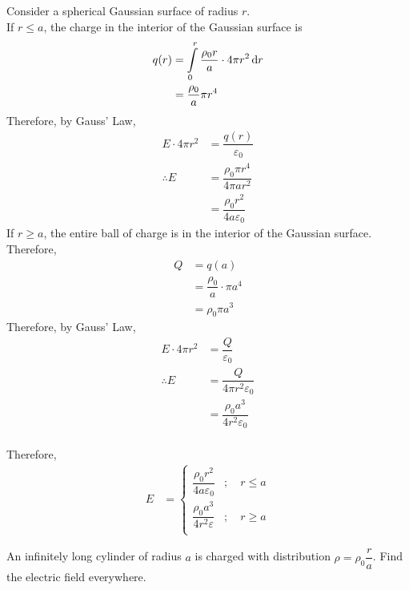 \documentclass[fleqn, a4paper, 12pt, twoside]{article}
\theoremstyle{definition}
\theoremstyle{theorem}
\begin{document}
\begin{solution}
	Consider a spherical Gaussian surface of radius $r$.\\
	If $r \leq a$, the charge in the interior of the Gaussian surface is
	\begin{align*}
		q(r) &= \int\limits_{0}^{r} \dfrac{\rho_0 r}{a} \cdot 4 \pi r^2 \dif r\\
		&= \dfrac{\rho_0}{a} \pi r^4
	\end{align*}
	Therefore, by Gauss' Law,
	\begin{align*}
		E \cdot 4 \pi r^2 &= \dfrac{q(r)}{\varepsilon_0}\\
		\therefore E &= \dfrac{\rho_0 \pi r^4}{4 \pi a r^2}\\
		&= \dfrac{\rho_0 r^2}{4 a \varepsilon_0}
	\end{align*}
	If $r \geq a$, the entire ball of charge is in the interior of the Gaussian surface.\\
	Therefore,
	\begin{align*}
		Q &= q(a)\\
		&= \dfrac{\rho_0}{a} \cdot \pi a^4\\
		&= \rho_0 \pi a^3
	\end{align*}
	Therefore, by Gauss' Law,
	\begin{align*}
		E \cdot 4 \pi r^2 &= \dfrac{Q}{\varepsilon_0}\\
		\therefore E &= \dfrac{Q}{4 \pi r^2 \varepsilon_0}\\
		&= \dfrac{\rho_0 a^3}{4 r^2 \varepsilon_0}
	\end{align*}
	~\\
	Therefore,
	\begin{align*}
		E &=
			\begin{cases}
				\dfrac{\rho_0 r^2}{4 a \varepsilon_0} &;\quad r \leq a\\
				\dfrac{\rho_0 a^3}{4 r^2 \varepsilon} &;\quad r \geq a\\
			\end{cases}
	\end{align*}
\end{solution}

\begin{question}
	An infinitely long cylinder of radius $a$ is charged with distribution $\rho = \rho_0 \dfrac{r}{a}$. Find the electric field everywhere.
\end{question}
\end{document}
